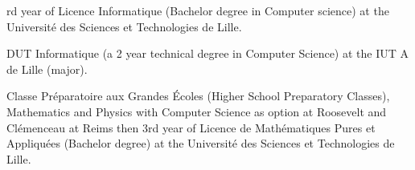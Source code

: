 \begin{rubric}{
}
\textup{rd} year of Licence Informatique (Bachelor degree in Computer science) at the Université des Sciences et Technologies de Lille.

\entry*[2009 - 2011]
DUT Informatique (a 2 year technical degree in Computer Science)  at the IUT A de Lille (major).

\entry*[2005 - 2009]
Classe Préparatoire aux Grandes Écoles (Higher School Preparatory Classes), Mathematics and Physics with Computer Science as option at Roosevelt and Clémenceau at Reims then 3\textup{rd} year of Licence de Mathématiques Pures et Appliquées (Bachelor degree) at the Université des Sciences et Technologies de Lille.



\end{rubric}
